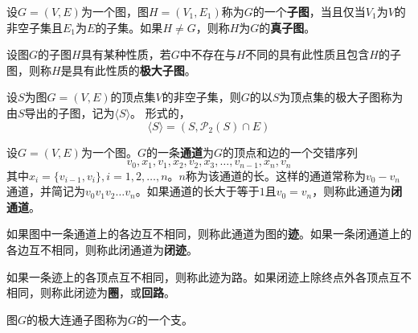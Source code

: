 \documentclass{beamer}
\begin{document}
\begin{CJK*}{UTF8}{gbsn}
\begin{frame}
\end{frame}
\begin{frame}
    \begin{Def}
    设$G=(V,E)$为一个图，图$H=(V_1,E_1)$称为$G$的一个{\bfseries 子图}，当且仅当$V_1$为$V$的
    非空子集且$E_1$为$E$的子集。如果$H \neq G$，则称$H$为$G$的{\bfseries 真子图}。
  \end{Def}
  \begin{Def}
    设图$G$的子图$H$具有某种性质，若$G$中不存在与$H$不同的具有此性质且包含$H$的子图，则称$H$是具有此性质的{\bfseries 极大子图}。
  \end{Def}
    \begin{Def}
    设$S$为图$G=(V,E)$的顶点集$V$的非空子集，则$G$的以$S$为顶点集的极大子图称为由$S$导出的子图，记为$\langle S \rangle$。
形式的，
\begin{equation*}
  \langle S \rangle=(S, \mathcal{P}_2(S) \cap E)
\end{equation*}
  \end{Def}
\end{frame}
\begin{frame}
    \begin{Def}
    设$G=(V,E)$为一个图。$G$的一条{\bfseries 通道}为$G$的顶点和边的一个交错序列
    \[v_0,x_1,v_1,x_2,v_2,x_3,\ldots,v_{n-1},x_n,v_n\]
    其中$x_i=\{v_{i-1},v_i\},i=1,2,\ldots,n$。$n$称为该通道的长。这样的通道常称为$v_0-v_n$通道，并简记为$v_0v_1v_2\ldots   v_n$。如果通道的长大于等于$1$且$v_0=v_n$，则称此通道为{\bfseries 闭通道}。
  \end{Def}
  \begin{Def}
   如果图中一条通道上的各边互不相同，则称此通道为图的{\bfseries 迹}。如果一条闭通道上的各边互不相同，则称此闭通道为{\bfseries 闭迹}。
  \end{Def}
  \begin{Def}
    如果一条迹上的各顶点互不相同，则称此迹为路。如果闭迹上除终点外各顶点互不相同，则称此闭迹为{\bfseries 圈}，或{\bfseries 回路}。
  \end{Def}
\end{frame}
\begin{frame}
     \begin{Def}
    图$G$的极大连通子图称为$G$的一个支。
  \end{Def}

\end{frame}
\end{CJK*}
\end{document}
